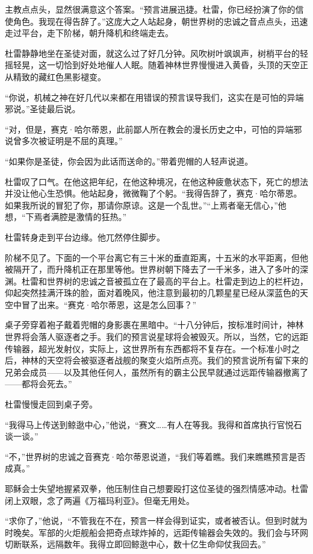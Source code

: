 \documentclass[AutoFakeBold=true]{book}
\begin{document}
主教点点头，显然很满意这个答案。``预言进展迅捷。杜雷，你已经扮演了你的信使角色。我现在得告辞了。''这庞大之人站起身，朝世界树的忠诚之音点点头，迅速走过平台，走下阶梯，朝升降机和终端走去。

杜雷静静地坐在圣徒对面，就这么过了好几分钟。风吹树叶飒飒声，树梢平台的轻摇轻晃，这一切恰到好处地催人人眠。随着神林世界慢慢进入黄昏，头顶的天空正从精致的藏红色黑影褪变。

``你说，机械之神在好几代以来都在用错误的预言误导我们，这实在是可怕的异端邪说。''圣徒最后说。

``对，但是，赛克·哈尔蒂恩，此前鄙人所在教会的漫长历史之中，可怕的异端邪说曾多次被证明是不屈的真理。''

``如果你是圣徒，你会因为此话而送命的。''带着兜帽的人轻声说道。

杜雷叹了口气。在他这把年纪，在他这种境况，在他这种疲惫状态下，死亡的想法并没让他心生恐惧。他站起身，微微鞠了个躬。``我得告辞了，赛克·哈尔蒂恩。如果我所说的冒犯了你，那请你原谅。这是一个乱世。''{\kaishu ``上焉者毫无信心，''}他想，{\kaishu ``下焉者满腔是激情的狂热。''}

杜雷转身走到平台边缘。他兀然停住脚步。

阶梯不见了。下面的一个平台离它有三十米的垂直距离，十五米的水平距离，但他被隔开了，而升降机正在那里等他。世界树朝下降去了一千米多，进入了多叶的深渊。杜雷和世界树的忠诚之音被孤立在了最高的平台上。杜雷走到边上的栏杆边，仰起突然挂满汗珠的脸，面对着晚风，他注意到最初的几颗星星已经从深蓝色的天空中冒了出来。``赛克·哈尔蒂恩，这是怎么回事？''

桌子旁穿着袍子戴着兜帽的身影裹在黑暗中。``十八分钟后，按标准时间计，神林世界将会落人驱逐者之手。我们的预言说星球将会被毁灭。所以，当然，它的远距传输器，超光发射仪，实际上，这世界所有东西都将不复存在。一个标准小时之后，神林的天空将会被驱逐者战舰的聚变火焰所点亮。我们的预言说所有留下来的兄弟会成员——以及其他任何人，虽然所有的霸主公民早就通过远距传输器撤离了——都将会死去。''

杜雷慢慢走回到桌子旁。

``我得马上传送到鲸逖中心，''他说，``赛文……有人在等我。我得和首席执行官悦石谈一谈。''

``不，''世界树的忠诚之音赛克·哈尔蒂恩说道，``我们等着瞧。我们来瞧瞧预言是否成真。''

耶稣会士失望地握紧双拳，他压制住自己想要殴打这位圣徒的强烈情感冲动。杜雷闭上双眼，念了两遍《万福玛利亚》。但毫无用处。

``求你了，''他说，``不管我在不在，预言一样会得到证实，或者被否认。但到时就为时晚矣。军部的火炬舰船会把奇点球炸掉的，远距传输器会失效的。我们会与环网切断联系，远隔数年。我得立即回鲸逖中心，数十亿生命仰仗我回去。''
\end{document}
